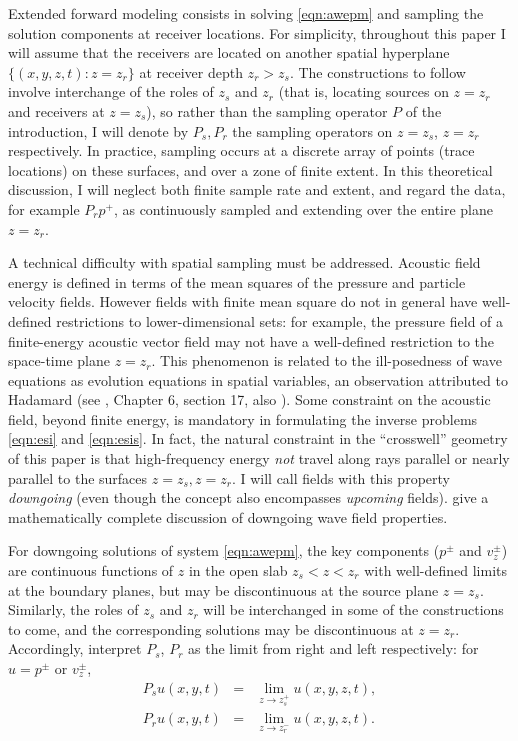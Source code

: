 Extended forward modeling consists in solving \ref{eqn:awepm} and
sampling the solution components at receiver locations. For
simplicity, throughout this paper I will assume that the receivers are
located on another spatial hyperplane $\{(x,y,z,t): z=z_r\}$ at
receiver depth $z_r>z_s$. The constructions to follow involve interchange
of the roles of $z_s$ and $z_r$ (that is, locating sources on $z=z_r$
and receivers at $z=z_s$), so rather than the sampling operator $P$ of
the introduction, I will denote by $P_s,P_r$ the sampling 
operators on $z=z_s$, $z=z_r$ respectively. In practice, sampling
occurs at a discrete array of points (trace locations) on these
surfaces, and over a zone of finite extent. In this theoretical
discussion, I will neglect both finite sample rate and extent, and
regard the data, for example $P_rp^+$, as continuously sampled and
extending over the entire plane $z=z_r$.

A technical difficulty with spatial sampling must be
addressed. Acoustic field energy is defined in terms of the mean
squares of the pressure and particle velocity fields. However fields
with finite mean square do not in general have well-defined
restrictions to lower-dimensional sets: for example, the pressure
field of a finite-energy acoustic vector field may not have a
well-defined restriction to the space-time plane $z=z_r$. This
phenomenon is related to the ill-posedness of wave equations as
evolution equations in spatial variables, an observation attributed to
Hadamard (see \cite{CourHil:62}, Chapter 6, section 17, also
\cite{Payn:75,Symes:83}). Some constraint on the acoustic field,
beyond finite energy, is mandatory in formulating the inverse problems
\ref{eqn:esi} and \ref{eqn:esis}. In fact, the natural constraint in
the ``crosswell'' geometry of this paper is that high-frequency energy
{\em not} travel along rays parallel or nearly parallel to the
surfaces $z=z_s, z=z_r$. I will call fields with this property {\em
  downgoing} (even though the concept also encompasses {\em upcoming}
fields). \cite{BaoSy:91b} give a mathematically complete discussion of
downgoing wave field properties.

For downgoing solutions of system \ref{eqn:awepm}, the key
components ($p^{\pm}$ and $v^{\pm}_z$) are continuous functions of $z$
in the open slab $z_s<z<z_r$ with well-defined limits at the boundary
planes, but may be discontinuous at the source plane
$z=z_s$. Similarly, the roles of $z_s$ and $z_r$ will be interchanged
in some of the constructions to come, and the corresponding solutions
may be discontinuous at $z=z_r$. Accordingly, interpret $P_s$, $P_r$
as the limit from right and left respectively: for $u=p^{\pm}$ or
$v^{\pm}_z$,
\begin{eqnarray}
  \label{eqn:defsamp}
  P_su(x,y,t) &=& \lim_{z \rightarrow z_s^+} u(x,y,z,t),\nonumber \\
  P_ru(x,y,t) &=& \lim_{z \rightarrow z_r^-} u(x,y,z,t).                  
\end{eqnarray}


